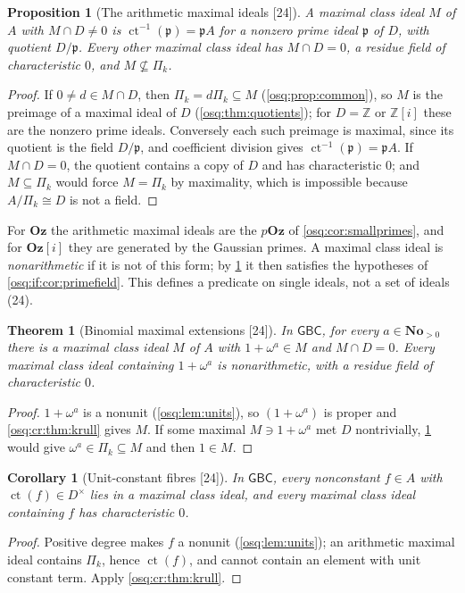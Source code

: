 \documentclass[11pt,letterpaper]{article}
\numberwithin{equation}{section}
\newtheorem{theorem}{Theorem}[section]
\newtheorem{proposition}[proposition]{Proposition}
\newtheorem{corollary}[corollary]{Corollary}
\theoremstyle{definition}
\theoremstyle{remark}
\theoremstyle{plain}
\newcommand{\No}{\mathbf{No}}
\newcommand{\Oz}{\mathbf{Oz}}
\newcommand{\GOz}{\Oz[i]}
\newcommand{\Z}{\mathbb Z}
\newcommand{\ct}{\operatorname{ct}}
\newcommand{\src}[1]{\textup{\textsf{[#1]}}}
\begin{document}
\begin{proposition}[The arithmetic maximal ideals \src{24}]\label{osq:cr:prop:arithmetic}
A maximal class ideal $M$ of $A$ with $M\cap D\ne0$ is $\ct^{-1}(\mathfrak p)=\mathfrak pA$ for a nonzero prime ideal $\mathfrak p$ of $D$, with
quotient $D/\mathfrak p$. Every other maximal class ideal has $M\cap D=0$, a residue field of characteristic $0$, and $M\not\subseteq\Pi_k$.
\end{proposition}
\begin{proof}
If $0\ne d\in M\cap D$, then $\Pi_k=d\Pi_k\subseteq M$ (\cref{osq:prop:common}), so $M$ is the preimage of a maximal ideal of $D$
(\cref{osq:thm:quotients}); for $D=\Z$ or $\Z[i]$ these are the nonzero prime ideals. Conversely each such preimage is maximal, since its quotient is the
field $D/\mathfrak p$, and coefficient division gives $\ct^{-1}(\mathfrak p)=\mathfrak pA$. If $M\cap D=0$, the quotient contains a copy of $D$ and has
characteristic $0$; and $M\subseteq\Pi_k$ would force $M=\Pi_k$ by maximality, which is impossible because $A/\Pi_k\cong D$ is not a field.
\end{proof}

For $\Oz$ the arithmetic maximal ideals are the $p\Oz$ of \cref{osq:cor:smallprimes}, and for $\GOz$ they are generated by the Gaussian primes. A
maximal class ideal is \emph{nonarithmetic} if it is not of this form; by \cref{osq:cr:prop:arithmetic} it then satisfies the hypotheses of
\cref{osq:if:cor:primefield}. This defines a predicate on single ideals, not a set of ideals (24).

\begin{theorem}[Binomial maximal extensions \src{24}]\label{osq:cr:thm:binomialmax}
In $\mathsf{GBC}$, for every $a\in\No_{>0}$ there is a maximal class ideal $M$ of $A$ with $1+\omega^a\in M$ and $M\cap D=0$. Every maximal
class ideal containing $1+\omega^a$ is nonarithmetic, with a residue field of characteristic $0$.
\end{theorem}
\begin{proof}
$1+\omega^a$ is a nonunit (\cref{osq:lem:units}), so $(1+\omega^a)$ is proper and \cref{osq:cr:thm:krull} gives $M$. If some maximal $M\ni1+\omega^a$
met $D$ nontrivially, \cref{osq:cr:prop:arithmetic} would give $\omega^a\in\Pi_k\subseteq M$ and then $1\in M$.
\end{proof}

\begin{corollary}[Unit-constant fibres \src{24}]\label{osq:cr:cor:unitconstant}
In $\mathsf{GBC}$, every nonconstant $f\in A$ with $\ct(f)\in D^\times$ lies in a maximal class ideal, and every maximal class ideal containing $f$
has characteristic $0$.
\end{corollary}
\begin{proof}
Positive degree makes $f$ a nonunit (\cref{osq:lem:units}); an arithmetic maximal ideal contains $\Pi_k$, hence $\ct(f)$, and cannot contain an element
with unit constant term. Apply \cref{osq:cr:thm:krull}.
\end{proof}
\end{document}
